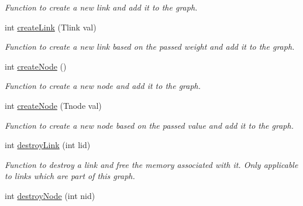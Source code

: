 \begin{DoxyCompactItemize}
\begin{DoxyCompactList}\small\item\em Function to create a new link and add it to the graph. \end{DoxyCompactList}\item 
\hypertarget{classGraph_a23ee6873217991bbc46d70dde9239e1f}{int \hyperlink{classGraph_a23ee6873217991bbc46d70dde9239e1f}{create\-Link} (Tlink val)}\label{classGraph_a23ee6873217991bbc46d70dde9239e1f}

\begin{DoxyCompactList}\small\item\em Function to create a new link based on the passed weight and add it to the graph. \end{DoxyCompactList}\item 
\hypertarget{classGraph_a3a887e466c64e283afccde959493bd4a}{int \hyperlink{classGraph_a3a887e466c64e283afccde959493bd4a}{create\-Node} ()}\label{classGraph_a3a887e466c64e283afccde959493bd4a}

\begin{DoxyCompactList}\small\item\em Function to create a new node and add it to the graph. \end{DoxyCompactList}\item 
\hypertarget{classGraph_aecb7bf8c8745903053807b05e5d6fefb}{int \hyperlink{classGraph_aecb7bf8c8745903053807b05e5d6fefb}{create\-Node} (Tnode val)}\label{classGraph_aecb7bf8c8745903053807b05e5d6fefb}

\begin{DoxyCompactList}\small\item\em Function to create a new node based on the passed value and add it to the graph. \end{DoxyCompactList}\item 
\hypertarget{classGraph_ab55f18c45c3ffa8c8d61a5517b856e17}{int \hyperlink{classGraph_ab55f18c45c3ffa8c8d61a5517b856e17}{destroy\-Link} (int lid)}\label{classGraph_ab55f18c45c3ffa8c8d61a5517b856e17}

\begin{DoxyCompactList}\small\item\em Function to destroy a link and free the memory associated with it. Only applicable to links which are part of this graph. \end{DoxyCompactList}\item 
\hypertarget{classGraph_a622e2c0ef87a8dd227d0ac04140e6680}{int \hyperlink{classGraph_a622e2c0ef87a8dd227d0ac04140e6680}{destroy\-Node} (int nid)}\label{classGraph_a622e2c0ef87a8dd227d0ac04140e6680}


\end{DoxyCompactItemize}
